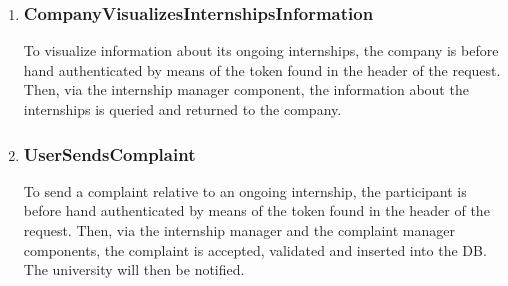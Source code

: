 \begin{enumerate}[label=\textbf{RV\arabic* -}]
\item \subsubsection{CompanyVisualizesInternshipsInformation}

To visualize information about its ongoing internships, the company is before hand authenticated by means of the token found in the header of the request.
Then, via the internship manager component, the information about the internships is queried and returned to the company.

\begin{figure}[H]
    \centering
\end{figure}

\item \subsubsection{UserSendsComplaint}

To send a complaint relative to an ongoing internship, the participant is before hand authenticated by means of the token found in the header of the request.
Then, via the internship manager and the complaint manager components, the complaint is accepted, validated and inserted into the DB.
The university will then be notified.

\begin{figure}[H]
    \centering
\end{figure}


\end{enumerate}
